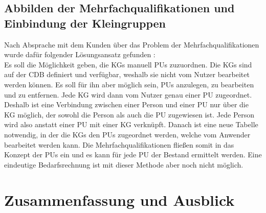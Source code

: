 \documentclass [12pt, a4paper, oneside, titlepage, ngerman]{article}
\begin{document}
\subsection{Abbilden der Mehrfachqualifikationen und Einbindung der Kleingruppen} %
Nach Absprache mit dem Kunden über das Problem der Mehrfachqualifikationen wurde dafür folgender Lösungsansatz gefunden \cite[vgl.][]{Gespraech4}: \\
Es soll die Möglichkeit geben, die \acp{KG} manuell \acp{PU} zuzuordnen. Die \acp{KG} sind auf der \ac{CDB} definiert und verfügbar, weshalb sie nicht vom Nutzer bearbeitet werden können. Es soll für ihn aber möglich sein, \acp{PU} anzulegen, zu bearbeiten und zu entfernen. Jede \ac{KG} wird dann vom Nutzer genau einer \ac{PU} zugeordnet. \\
Deshalb ist eine Verbindung zwischen einer Person und einer \ac{PU} nur über die \ac{KG} möglich, der sowohl die Person als auch die \ac{PU} zugewiesen ist. Jede Person wird also anstatt einer \ac{PU} mit einer \ac{KG} verknüpft. Danach ist eine neue Tabelle notwendig, in der die \acp{KG} den \acp{PU} zugeordnet werden, welche vom Anwender bearbeitet werden kann. Die Mehrfachqualifikationen fließen somit in das Konzept der \acp{PU} ein und es kann für jede \ac{PU} der Bestand ermittelt werden. Eine eindeutige Bedarfsrechnung ist mit dieser Methode aber noch nicht möglich. \\

\newpage

\section {Zusammenfassung und Ausblick}
\end{document}
